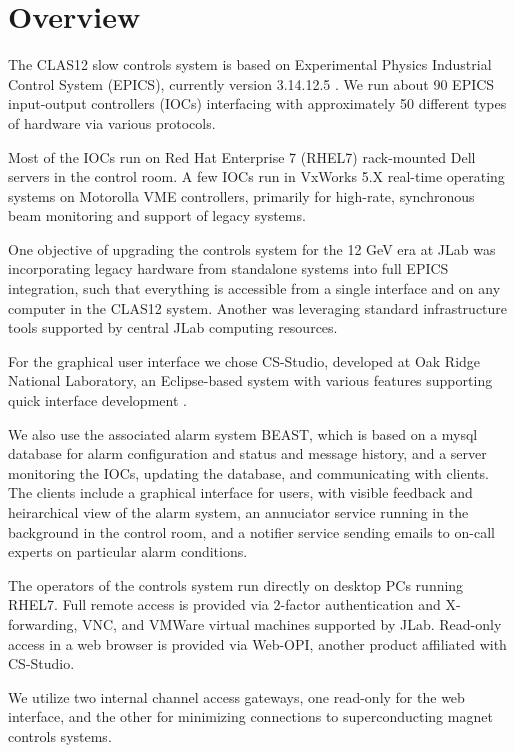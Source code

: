 \section{Overview}

The CLAS12 slow controls system is based on Experimental Physics Industrial Control System (EPICS), currently version 3.14.12.5 \cite{epics-website}.  We run about 90 EPICS input-output controllers (IOCs) interfacing with approximately 50 different types of hardware via various protocols.

Most of the IOCs run on Red Hat Enterprise 7 (RHEL7) rack-mounted Dell servers in the control room.  A few IOCs run in VxWorks 5.X real-time operating systems on Motorolla VME controllers, primarily for high-rate, synchronous beam monitoring and support of legacy systems.

One objective of upgrading the controls system for the 12 GeV era at JLab was incorporating legacy hardware from standalone systems into full EPICS integration, such that everything is accessible from a single interface and on any computer in the CLAS12 system.  Another was leveraging standard infrastructure tools supported by central JLab computing resources.

For the graphical user interface we chose CS-Studio, developed at Oak Ridge National Laboratory, an Eclipse-based system with various features supporting quick interface development \cite{css-website}.

We also use the associated alarm system BEAST, which is based on a mysql database for alarm configuration and status and message history, and a server monitoring the IOCs, updating the database, and communicating with clients.  The clients include a graphical interface for users, with visible feedback and heirarchical view of the alarm system, an annuciator service running in the background in the control room, and a notifier service sending emails to on-call experts on particular alarm conditions.

The operators of the controls system run directly on desktop PCs running RHEL7.  Full remote access is provided via 2-factor authentication and X-forwarding, VNC, and VMWare virtual machines supported by JLab.  Read-only access in a web browser is provided via Web-OPI, another product affiliated with CS-Studio.

We utilize two internal channel access gateways, one read-only for the web interface, and the other for minimizing connections to superconducting magnet controls systems.

